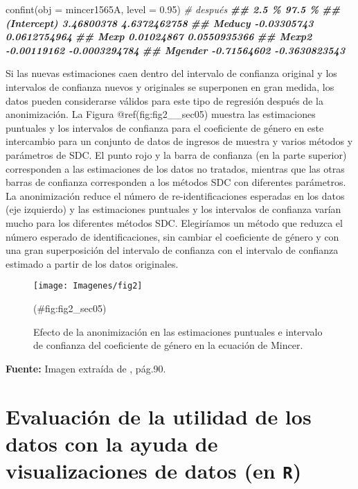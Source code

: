 \documentclass[
]{book}
\newenvironment{Shaded}{\begin{snugshade}}{\end{snugshade}}
\newcommand{\AttributeTok}[1]{\textcolor[rgb]{0.77,0.63,0.00}{#1}}
\newcommand{\CommentTok}[1]{\textcolor[rgb]{0.56,0.35,0.01}{\textit{#1}}}
\newcommand{\DocumentationTok}[1]{\textcolor[rgb]{0.56,0.35,0.01}{\textbf{\textit{#1}}}}
\newcommand{\FloatTok}[1]{\textcolor[rgb]{0.00,0.00,0.81}{#1}}
\newcommand{\FunctionTok}[1]{\textcolor[rgb]{0.00,0.00,0.00}{#1}}
\newcommand{\NormalTok}[1]{#1}
\theoremstyle{definition}
\theoremstyle{definition}
\theoremstyle{definition}
\theoremstyle{definition}
\theoremstyle{remark}
\begin{document}
\begin{Shaded}
\begin{Highlighting}[]
\FunctionTok{confint}\NormalTok{(}\AttributeTok{obj =}\NormalTok{ mincer1565A, }\AttributeTok{level =} \FloatTok{0.95}\NormalTok{) }\CommentTok{\# después}
\DocumentationTok{\#\#                   2.5 \%        97.5 \%}
\DocumentationTok{\#\# (Intercept)  3.46800378  4.6372462758}
\DocumentationTok{\#\# Meducy      {-}0.03305743  0.0612754964}
\DocumentationTok{\#\# Mexp         0.01024867  0.0550935366}
\DocumentationTok{\#\# Mexp2       {-}0.00119162 {-}0.0003294784}
\DocumentationTok{\#\# Mgender     {-}0.71564602 {-}0.3630823543}
\end{Highlighting}
\end{Shaded}

Si las nuevas estimaciones caen dentro del intervalo de confianza original y los intervalos de confianza nuevos y originales se superponen en gran medida, los datos pueden considerarse válidos para este tipo de regresión después de la anonimización. La Figura @ref(fig:fig2\_\_sec05) muestra las estimaciones puntuales y los intervalos de confianza para el coeficiente de género en este intercambio para un conjunto de datos de ingresos de muestra y varios métodos y parámetros de SDC. El punto rojo y la barra de confianza (en la parte superior) corresponden a las estimaciones de los datos no tratados, mientras que las otras barras de confianza corresponden a los métodos SDC con diferentes parámetros. La anonimización reduce el número de re-identificaciones esperadas en los datos (eje izquierdo) y las estimaciones puntuales y los intervalos de confianza varían mucho para los diferentes métodos SDC. Elegiríamos un método que reduzca el número esperado de identificaciones, sin cambiar el coeficiente de género y con una gran superposición del intervalo de confianza con el intervalo de confianza estimado a partir de los datos originales.

\begin{figure}

{\centering \texttt{[image: Imagenes/fig2]} 

}

\caption{Efecto de la anonimización en las estimaciones puntuales e intervalo de confianza del coeficiente de género en la ecuación de Mincer.}(\#fig:fig2_sec05)
\end{figure}

\textbf{Fuente:} Imagen extraída de \citep{benschop2021}, pág.90.

\hypertarget{evaluaciuxf3n-de-la-utilidad-de-los-datos-con-la-ayuda-de-visualizaciones-de-datos-en-r}{%
\section{\texorpdfstring{Evaluación de la utilidad de los datos con la ayuda de visualizaciones de datos (en \texttt{R})}{Evaluación de la utilidad de los datos con la ayuda de visualizaciones de datos (en R)}}\label{evaluaciuxf3n-de-la-utilidad-de-los-datos-con-la-ayuda-de-visualizaciones-de-datos-en-r}}
\end{document}
